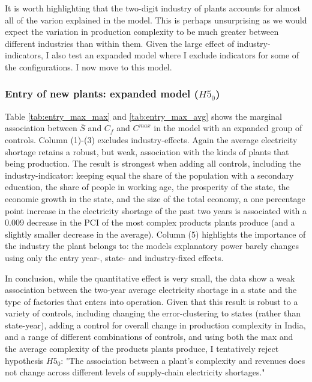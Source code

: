 \documentclass[11pt]{article}
\begin{document}
It is worth highlighting that the two-digit industry of plants accounts for almost all of the varion explained in the model. This is perhaps unsurprising as we would expect the variation in production complexity to be much greater between different industries than within them. Given the large effect of industry-indicators, I also test an expanded model where I exclude indicators for some of the configurations. I now move to this model.

\subsubsection{Entry of new plants: expanded model ($H5_0$)}
 Table \ref{tab:entry_max_max} and \ref{tab:entry_max_avg} shows the marginal association between $\bar{S}$ and $C_f$ and $C^{max}$ in the model with an expanded group of controls. Column (1)-(3) excludes industry-effects. Again the average electricity shortage retains a robust, but weak, association with the kinds of plants that being production. The result is strongest when adding all controls, including the industry-indicator: keeping equal the share of the population with a secondary education, the share of people in working age, the prosperity of the state, the economic growth in the state, and the size of the total economy, a one percentage point increase in the electricity shortage of the past two years is associated with a 0.009 decrease in the PCI of the most complex products plants produce (and a slightly smaller decrease in the average). Column (5) highlights the importance of the industry the plant belongs to: the models explanatory power barely changes using only the entry year-, state- and industry-fixed effects.

In conclusion, while the quantitative effect is very small, the data show a weak association between the two-year average electricity shortage in a state and the type of factories that enters into operation. Given that this result is robust to a variety of controls, including changing the error-clustering to states (rather than state-year), adding a control for overall change in production complexity in India, and a range of different combinations of controls, and using both the max and the average complexity of the products plants produce, I tentatively reject hypothesis $H5_0$: "The association between a plant's complexity and revenues does not change across different levels of supply-chain electricity shortages."
\end{document}
